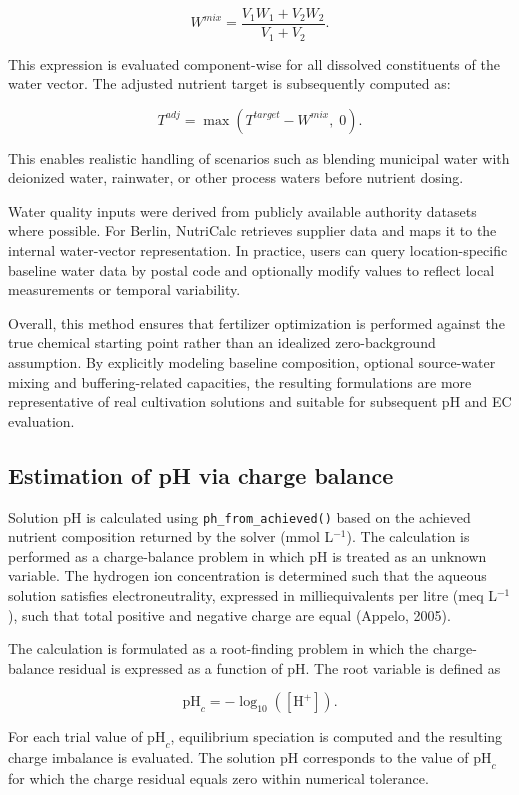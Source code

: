 \documentclass[
  letterpaper,
  DIV=11,
  numbers=noendperiod]{scrreprt}
\begin{document}
\[
W^{mix} = \frac{V_1 W_1 + V_2 W_2}{V_1 + V_2}.
\]

This expression is evaluated component-wise for all dissolved
constituents of the water vector. The adjusted nutrient target is
subsequently computed as:

\[
T^{adj} = \max\!\left(T^{target} - W^{mix},\; 0\right).
\]

This enables realistic handling of scenarios such as blending municipal
water with deionized water, rainwater, or other process waters before
nutrient dosing.

Water quality inputs were derived from publicly available authority
datasets where possible. For Berlin, NutriCalc retrieves supplier data
and maps it to the internal water-vector representation. In practice,
users can query location-specific baseline water data by postal code and
optionally modify values to reflect local measurements or temporal
variability.

Overall, this method ensures that fertilizer optimization is performed
against the true chemical starting point rather than an idealized
zero-background assumption. By explicitly modeling baseline composition,
optional source-water mixing and buffering-related capacities, the
resulting formulations are more representative of real cultivation
solutions and suitable for subsequent pH and EC evaluation.

\subsection{Estimation of pH via charge
balance}\label{estimation-of-ph-via-charge-balance}

Solution pH is calculated using \texttt{ph\_from\_achieved()} based on
the achieved nutrient composition returned by the solver (mmol
L\(^{-1}\)). The calculation is performed as a charge-balance problem in
which pH is treated as an unknown variable. The hydrogen ion
concentration is determined such that the aqueous solution satisfies
electroneutrality, expressed in milliequivalents per litre (meq
L\(^{-1}\)), such that total positive and negative charge are equal
(Appelo, 2005).

The calculation is formulated as a root-finding problem in which the
charge-balance residual is expressed as a function of pH. The root
variable is defined as

\[
\mathrm{pH}_c = -\log_{10}([\mathrm{H}^+]).
\]

For each trial value of \(\mathrm{pH}_c\), equilibrium speciation is
computed and the resulting charge imbalance is evaluated. The solution
pH corresponds to the value of \(\mathrm{pH}_c\) for which the charge
residual equals zero within numerical tolerance.
\end{document}
